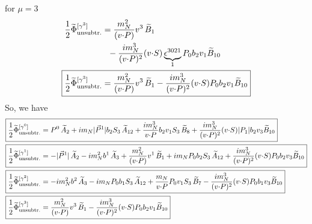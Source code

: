 \documentclass[]{article}
\numberwithin{equation}{section}
\newcommand{\tcdot}{{\cdot}}
\newcommand{\tAmp}{\widetilde{A}}
\newcommand{\tBmp}{\widetilde{B}}
\newcommand{\tAmp}{\ensuremath{\widetilde{A}^{(+)}}}
\newcommand{\tBmp}{\ensuremath{\widetilde{B}^{(+)}}}
\newcommand{\bvec}{b}
\newcommand{\mN}{m_N}
\newcommand{\unsub}{\text{unsubtr.}}
\begin{document}
for $\mu=3$
\begin{align}
    \frac{1}{2}\widetilde \Phi^{[\gamma^3]}_{\unsub} & = \frac{\mN^2}{(v \tcdot P)} v^3\, \tBmp_1 
		\nonumber \\ &
		~~
		- \frac{i \mN^3}{(v \tcdot P)^2} (v \tcdot S) \underbrace{\epsilon^{3 0 2 1}}_{1} P_0 \bvec_2 v_1 \tBmp_{10}\\
  \Aboxed{\frac{1}{2}\widetilde \Phi^{[\gamma^3]}_{\unsub}& = \frac{\mN^2}{(v \tcdot P)} v^3\, \tBmp_1- \frac{i \mN^3}{(v \tcdot P)^2} (v \tcdot S)  P_0 \bvec_2 v_1 \tBmp_{10}}
\end{align}
So, we have
\begin{align}
   \Aboxed{ \frac{1}{2}\widetilde \Phi^{[\gamma^{0}]}_{\unsub}& = P^0\, \tAmp_2  + i \mN  |\vec{P}^1| \bvec_2 S_3\, \tAmp_{12}+ \frac{ i \mN^3}{v \tcdot P}  \bvec_2 v_1 S_3\, \tBmp_8+ \frac{i \mN^3}{(v \tcdot P)^2} (v \tcdot S)  |P_1| \bvec_2 v_3 \tBmp_{10}}\\
   \Aboxed{ \frac{1}{2}\widetilde \Phi^{[\gamma^{1}]}_{\unsub} & =-|\vec{P}^1|\, \tAmp_2- i \mN^2 \bvec^1\, \tAmp_3+ \frac{\mN^2}{(v \tcdot P)} v^1\, \tBmp_1 
		+ i \mN  P_0 \bvec_2 S_3\, \tAmp_{12}+ \frac{i \mN^3}{(v \tcdot P)^2} (v \tcdot S)  P_0 \bvec_2 v_3 \tBmp_{10}}\\
   \Aboxed{\frac{1}{2}\widetilde \Phi^{[\gamma^2]}_{\unsub} & =- i \mN^2 \bvec^2\, \tAmp_3
		- i \mN  P_0 \bvec_1 S_3\, \tAmp_{12}+ \frac{\mN}{v \tcdot P}  P_0 v_1 S_3\, \tBmp_7- \frac{i \mN^3}{(v \tcdot P)^2} (v \tcdot S) P_0 \bvec_1 v_3 \tBmp_{10}}\\
    \Aboxed{\frac{1}{2}\widetilde \Phi^{[\gamma^3]}_{\unsub}& = \frac{\mN^2}{(v \tcdot P)} v^3\, \tBmp_1- \frac{i \mN^3}{(v \tcdot P)^2} (v \tcdot S)  P_0 \bvec_2 v_1 \tBmp_{10}}
\end{align}
\end{document}
